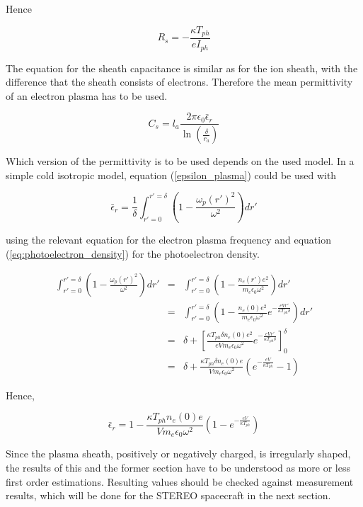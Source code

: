 \documentclass[a4paper,11pt]{thesis}
\begin{document}
Hence

\begin{equation}
    R_s=-\frac{\kappa T_{ph}}{eI_{ph}}
\end{equation}

The equation for the sheath capacitance is similar as for the ion sheath, with the difference that the sheath consists of electrons. Therefore the mean permittivity of an electron plasma has to be used.

\begin{equation}
C_s=l_a\frac{2\pi \epsilon_0 \bar{\epsilon}_r}{\ln{\left( \frac{\delta}{r_a} \right)}}
\end{equation}

Which version of the permittivity is to be used depends on the used model. In a simple cold isotropic model, equation (\ref{epsilon_plasma}) could be used with

\begin{equation}
    \bar{\epsilon}_r=\frac{1}{\delta}\int_{r'=0}^{r'=\delta}\left( 1-\frac{\omega_p(r')^2}{\omega^2}\right) dr'
\end{equation}

using the relevant equation for the electron plasma frequency and equation (\ref{eq:photoelectron_density}) for the photoelectron density.

\begin{eqnarray}
\int_{r'=0}^{r'=\delta}\left( 1-\frac{\omega_p(r')^2}{\omega^2}\right) dr'&=&\int_{r'=0}^{r'=\delta}\left( 1-\frac{n_e(r')e^2}{m_e\epsilon_0\omega^2}\right) dr'\\
&=&\int_{r'=0}^{r'=\delta}\left( 1-\frac{n_e(0)e^2}{m_e\epsilon_0\omega^2}e^{-\frac{eVr'}{\kappa T_{ph}\delta}}\right) dr'\\
&=&\delta+\left[\frac{\kappa T_{ph}\delta n_e(0)e^2}{eV m_e\epsilon_0\omega^2}e^{-\frac{eVr'}{\kappa T_{ph}\delta}}\right]_0^\delta \\
&=&\delta+\frac{\kappa T_{ph}\delta n_e(0)e}{V m_e\epsilon_0\omega^2}\left(e^{-\frac{eV}{\kappa T_{ph}}}-1 \right)
\end{eqnarray}

Hence,

\begin{equation}
    \bar{\epsilon}_r=1-\frac{\kappa T_{ph} n_e(0)e}{V m_e\epsilon_0\omega^2}\left(1-e^{-\frac{eV}{\kappa T_{ph}}} \right)
\end{equation}

Since the plasma sheath, positively or negatively charged, is irregularly shaped, the results of this and the former section have to be understood as more or less first order estimations. Resulting values should be checked against measurement results, which will be done for the STEREO spacecraft in the next section.
\end{document}
